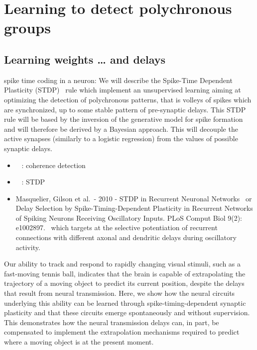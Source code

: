 \documentclass[brainsci, %
               review,submit,pdftex,moreauthors]{Definitions/mdpi}
\begin{document}
\section{Learning to detect polychronous groups}\label{learning-to-detect-polychronous-groups}
\subsection{Learning weights \ldots{} and delays}\label{learning-weights-and-delays}
spike time coding in a neuron: We will describe the Spike-Time Dependent Plasticity (STDP)~\citep{markram_regulation_1997} rule which implement an unsupervised learning aiming at optimizing the detection of polychronous patterns, that is volleys of spikes which are synchronized, up to some stable pattern of pre-synaptic delays. This STDP rule will be based by the inversion of the generative model for spike formation and will therefore be derived by a Bayesian approach. This will decouple the active synapses (similarly to a logistic regression) from the values of possible synaptic delays.

\begin{itemize}
 \item
 ~\citep{perrinet_coherence_2002} : coherence detection
\item
 ~\citep{perrinet_networks_2001} : STDP
\item
  Masquelier, Gilson et al.~- 2010 - STDP in Recurrent Neuronal Networks~\citep{gilson_stdp_2010} or Delay Selection by Spike-Timing-Dependent Plasticity in Recurrent Networks of Spiking Neurons Receiving Oscillatory Inputs. PLoS Comput Biol 9(2): e1002897.~\citep{kerr_delay_2013} which targets at the selective potentiation of recurrent connections with different axonal and dendritic delays during oscillatory activity.
\end{itemize}

Our ability to track and respond to rapidly changing visual stimuli, such as a fast-moving tennis ball, indicates that the brain is capable of extrapolating the trajectory of a moving object to predict its current position, despite the delays that result from neural transmission. Here, we show how the neural circuits underlying this ability can be learned through spike-timing-dependent synaptic plasticity and that these circuits emerge spontaneously and without supervision. This demonstrates how the neural transmission delays can, in part, be compensated to implement the extrapolation mechanisms required to predict where a moving object is at the present moment.~\citep{burkitt_predictive_2021}
\end{document}

